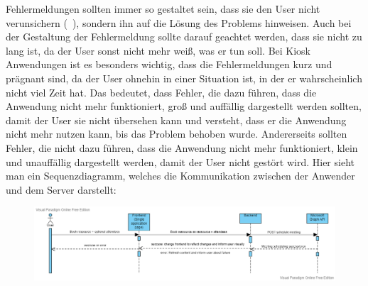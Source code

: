 Fehlermeldungen sollten immer so gestaltet sein, dass sie den User nicht verunsichern (~\cite{interaction-design-book1}), sondern ihn auf die Lösung des Problems hinweisen.
Auch bei der Gestaltung der Fehlermeldung sollte darauf geachtet werden, dass sie nicht zu lang ist, da der User sonst nicht mehr weiß, was er tun soll.
Bei Kiosk Anwendungen ist es besonders wichtig, dass die Fehlermeldungen kurz und prägnant sind, da der User ohnehin in einer Situation ist, in der er wahrscheinlich nicht viel Zeit hat.
Das bedeutet, dass Fehler, die dazu führen, dass die Anwendung nicht mehr funktioniert, groß und auffällig dargestellt werden sollten, damit der User sie nicht übersehen kann und versteht, dass er die Anwendung nicht mehr nutzen kann, bis das Problem behoben wurde.
Andererseits sollten Fehler, die nicht dazu führen, dass die Anwendung nicht mehr funktioniert, klein und unauffällig dargestellt werden, damit der User nicht gestört wird.
\newline
\newline
Hier sieht man ein Sequenzdiagramm, welches die Kommunikation zwischen der Anwender und dem Server darstellt:
\newline
\newline
\par\vspace{0.5cm}
\begin{figure}[h]
\centering
\includegraphics[width=\textwidth]{Bilder/Objektorientiertes Design/Sequence diagram for ressource booking (3)}
\par\vspace{0.5cm}
\end{figure}
\justifying
\newline
\newline
